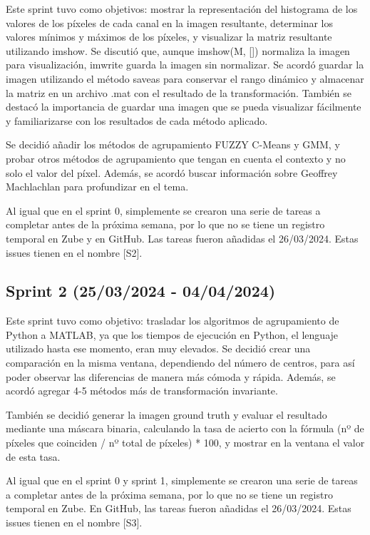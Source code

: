 Este sprint tuvo como objetivos: mostrar la representación del histograma de los valores de los píxeles de cada canal en la imagen resultante, determinar los valores mínimos y máximos de los píxeles, y visualizar la matriz resultante utilizando imshow. Se discutió que, aunque imshow(M, []) normaliza la imagen para visualización, imwrite guarda la imagen sin normalizar. Se acordó guardar la imagen utilizando el método saveas para conservar el rango dinámico y almacenar la matriz en un archivo .mat con el resultado de la transformación. También se destacó la importancia de guardar una imagen que se pueda visualizar fácilmente y familiarizarse con los resultados de cada método aplicado.

Se decidió añadir los métodos de agrupamiento FUZZY C-Means y GMM, y probar otros métodos de agrupamiento que tengan en cuenta el contexto y no solo el valor del píxel. Además, se acordó buscar información sobre Geoffrey Machlachlan para profundizar en el tema.

Al igual que en el sprint 0, simplemente se crearon una serie de tareas a completar antes de la próxima semana, por lo que no se tiene un registro temporal en Zube y en GitHub. Las tareas fueron añadidas el 26/03/2024. Estas issues tienen en el nombre [S2].

\subsection{Sprint 2 (25/03/2024 - 04/04/2024)}\label{sprint-2}

Este sprint tuvo como objetivo: trasladar los algoritmos de agrupamiento de Python a MATLAB, ya que los tiempos de ejecución en Python, el lenguaje utilizado hasta ese momento, eran muy elevados. Se decidió crear una comparación en la misma ventana, dependiendo del número de centros, para así poder observar las diferencias de manera más cómoda y rápida. Además, se acordó agregar 4-5 métodos más de transformación invariante.

También se decidió generar la imagen ground truth y evaluar el resultado mediante una máscara binaria, calculando la tasa de acierto con la fórmula  (nº de píxeles que coinciden / nº total de píxeles) * 100, y mostrar en la ventana el valor de esta tasa.

Al igual que en el sprint 0 y sprint 1, simplemente se crearon una serie de tareas a completar antes de la próxima semana, por lo que no se tiene un registro temporal en Zube. En GitHub, las tareas fueron añadidas el 26/03/2024. Estas issues tienen en el nombre [S3].

